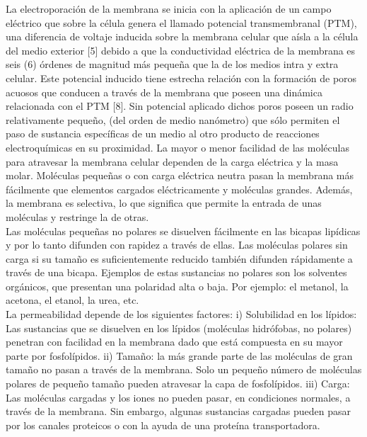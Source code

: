 La electroporación de la membrana se inicia con la aplicación de un campo eléctrico que sobre la célula genera el llamado potencial transmembranal (PTM), una diferencia de voltaje inducida sobre la membrana celular que aísla a la célula del medio exterior [5] debido a que la conductividad eléctrica de la membrana es seis (6) órdenes de magnitud más pequeña que la de los medios intra y extra celular. Este potencial inducido tiene estrecha relación con la formación de poros acuosos que conducen a través de la membrana que poseen una dinámica relacionada con el PTM [8]. Sin potencial aplicado dichos poros poseen un radio relativamente pequeño, (del orden de medio nanómetro) que sólo permiten el paso de sustancia específicas de un medio al otro producto de reacciones electroquímicas en su proximidad. La mayor o menor facilidad de las moléculas para atravesar la membrana celular dependen de la carga eléctrica y la masa molar. Moléculas pequeñas o con carga eléctrica neutra pasan la membrana más fácilmente que elementos cargados eléctricamente y moléculas grandes. Además, la membrana es selectiva, lo que significa que permite la entrada de unas moléculas y restringe la de otras.\\
Las moléculas pequeñas no polares se disuelven fácilmente en las bicapas lipídicas y por lo tanto difunden con rapidez a través de ellas. Las moléculas polares sin carga si su tamaño es suficientemente reducido también difunden rápidamente a través de una bicapa. Ejemplos de estas sustancias no polares son los solventes orgánicos, que presentan una polaridad alta o baja. Por ejemplo: el metanol, la acetona, el etanol, la urea, etc.\\

La permeabilidad depende de los siguientes factores: i) Solubilidad en los lípidos: Las sustancias que se disuelven en los lípidos (moléculas hidrófobas, no polares) penetran con facilidad en la membrana dado que está compuesta en su mayor parte por fosfolípidos. ii) Tamaño: la más grande parte de las moléculas de gran tamaño no pasan a través de la membrana. Solo un pequeño número de moléculas polares de pequeño tamaño pueden atravesar la capa de fosfolípidos. iii) Carga: Las moléculas cargadas y los iones no pueden pasar, en condiciones normales, a través de la membrana. Sin embargo, algunas sustancias cargadas pueden pasar por los canales proteicos o con la ayuda de una proteína transportadora.\\

